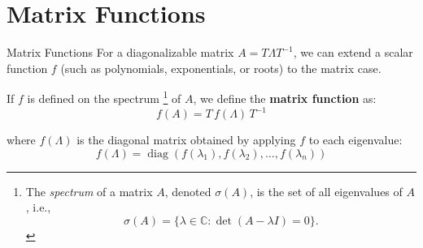 
\section{Matrix Functions}

\begin{frame}[t]{Matrix Functions}
    For a diagonalizable matrix $A = T \Lambda T^{-1}$, we can extend a scalar function $f$ (such as polynomials, exponentials, or roots) to the matrix case.

    \begin{alert}
        If $f$ is defined on the spectrum%
        \footnote{The \emph{spectrum} of a matrix $A$, denoted $\sigma(A)$, is the set of all eigenvalues of $A$, i.e.,
            \[
                \sigma(A) = \{\lambda \in \mathbb{C} : \det(A - \lambda I) = 0\}.
            \]}%
        of $A$, we define the \textbf{matrix function} as:
        \[
            f(A) = T \, f(\Lambda) \, T^{-1}
        \]
    \end{alert}


    where $f(\Lambda)$ is the diagonal matrix obtained by applying $f$ to each eigenvalue:
    \[
        f(\Lambda) = \operatorname{diag}\left(f(\lambda_1), f(\lambda_2), \dots, f(\lambda_n)\right)
    \]


    \vfill
\end{frame}


